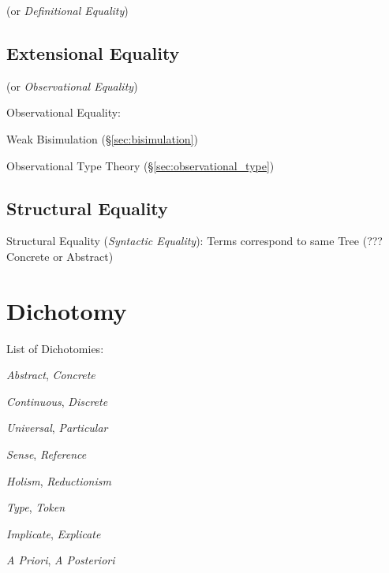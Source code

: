 (or \emph{Definitional Equality})



\subsection{Extensional Equality}\label{sec:extensional_equality}

(or \emph{Observational Equality})

Observational Equality: %

Weak Bisimulation (\S\ref{sec:bisimulation})

Observational Type Theory (\S\ref{sec:observational_type})



\subsection{Structural Equality}\label{sec:structural_equality}

Structural Equality (\emph{Syntactic Equality}): Terms correspond to
same Tree (??? Concrete or Abstract)



\section{Dichotomy}\label{sec:dichotomy}

List of Dichotomies:

\emph{Abstract}, \emph{Concrete}

\emph{Continuous}, \emph{Discrete} %

\emph{Universal}, \emph{Particular}

\emph{Sense}, \emph{Reference}

\emph{Holism}, \emph{Reductionism}

\emph{Type}, \emph{Token}

\emph{Implicate}, \emph{Explicate}

\emph{A Priori}, \emph{A Posteriori}

